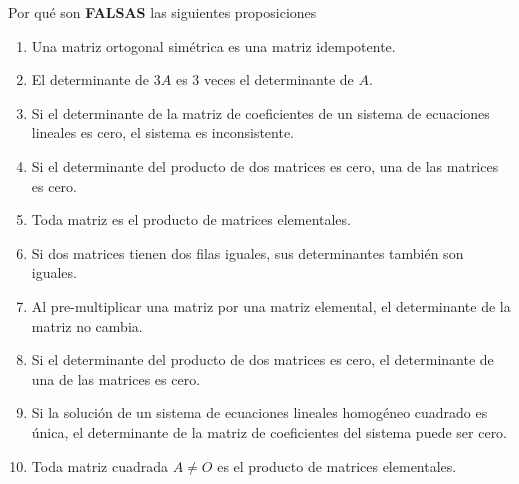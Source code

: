 \item Por qué son \textbf{FALSAS} las siguientes proposiciones
    \begin{enumerate}[label=\listAlph]
        \item Una matriz ortogonal simétrica es una matriz idempotente.
        \item El determinante de \(3A\) es 3 veces el determinante de \(A\).
        \item Si el determinante de la matriz de coeficientes de un sistema de ecuaciones lineales es cero, el sistema es inconsistente.
        \item Si el determinante del producto de dos matrices es cero, una de las matrices es cero.
        \item Toda matriz es el producto de matrices elementales.
        \item Si dos matrices tienen dos filas iguales, sus determinantes también son iguales.
        \item Al pre-multiplicar una matriz por una matriz elemental, el determinante de la matriz no cambia.
        \item Si el determinante del producto de dos matrices es cero, el determinante de una de las matrices es cero.
        \item Si la solución de un sistema de ecuaciones lineales homogéneo cuadrado es única, el determinante de la matriz de coeficientes del sistema puede ser cero.
        \item Toda matriz cuadrada \(A \neq O\) es el producto de matrices elementales.
    \end{enumerate}

